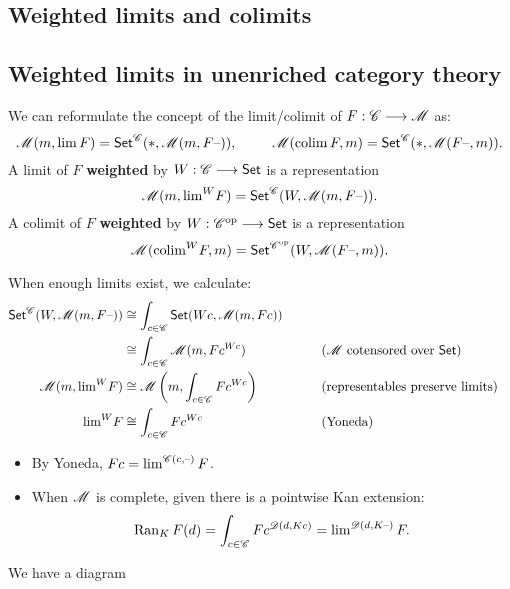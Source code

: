 \documentclass[11pt]{article}
\begin{document}
\begin{8. Weighted limits and colimits}
\section*{Weighted limits and colimits}
\subsection*{Weighted limits in unenriched category theory}
\begin{itemise}
\setlength{\parindent}{.25in}
\item We can reformulate the concept of the limit/colimit of $F:\mathscr{C}\longrightarrow\mathscr{M}$ as:
\[\mathscr{M}(m,\operatorname*{lim} F)=\operatorname{{\mathsf{Set}}}^{\mathscr{C}}(*,\mathscr{M}(m,F\textup{--} )),\ \qquad \,\mathscr{M}(\operatorname*{colim} F,m)=\operatorname{{\mathsf{Set}}}^{\mathscr{C}}(*,\mathscr{M}(F\textup{--},m )).\]
A limit of $F$ \textbf{weighted} by $W:\mathscr{C}\longrightarrow\operatorname{{\mathsf{Set}}}$ is a representation
\[\mathscr{M}(m,\textstyle\operatorname*{lim}^W\! F)=\operatorname{{\mathsf{Set}}}^{\mathscr{C}}(W,\mathscr{M}(m,F\textup{--} )).\]
A colimit of $F$ \textbf{weighted} by $W:\mathscr{C}^{\textup{op}}\longrightarrow\operatorname{{\mathsf{Set}}}$ is a representation
\[\mathscr{M}(\textstyle\operatorname*{colim}^W\! F,m)=\operatorname{{\mathsf{Set}}}^{\mathscr{C}^{\textup{op}}}(W,\mathscr{M}(F\textup{--},m )).\]
\item When enough limits exist, we calculate:
\begin{alignat*}{2}
\Set^\scrc(W,\scrm(m,F\DASH )) 
&\cong
\int_{c\in\scrc}\Set(Wc,\scrm(m,Fc))%
\\
&\cong
\int_{c\in\scrc}\scrm(m,Fc^{Wc})%
&\qquad&\text{($\scrm$ cotensored over $\Set$)}\\
\scrm(m,\textstyle\limit^W\! F)
&\cong
\scrm\left(m,\int_{c\in\scrc}Fc^{Wc}\right)%
&\qquad&\text{(representables preserve limits)}\\
\textstyle\limit^W\! F
&\cong
\int_{c\in\scrc}Fc^{Wc}%
&\qquad&\text{(Yoneda)}
\end{alignat*}
\begin{itemize}\squishlist
\setlength{\parindent}{.25in}
\item By Yoneda, $Fc=\operatorname*{lim}^{\mathscr{C}(c,\textup{--} )}F$.
\item When $\mathscr{M}$ is complete, given 
 there is a pointwise Kan extension:
\[\operatorname{Ran}_KF(d)=\int_{c\in\mathscr{C}} Fc^{\mathscr{D}(d,Kc)}= \textstyle\operatorname*{lim}^{\mathscr{D}(d,K\textup{--} )}F.\]
\end{itemize}
\item We have a diagram 

\end{itemise}
\end{8. Weighted limits and colimits}
\end{document}
